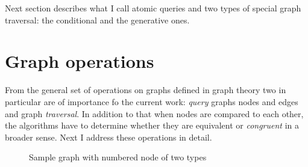 Next section describes what I call atomic queries and two types of special graph traversal: the conditional and the generative ones. 

\section{Graph operations}
From the general set of operations on graphs defined in graph theory \citep{bondy1976graph, west2001graph} two in particular are of importance fo the current work: \textit{query} graphs nodes and edges and graph \textit{traversal}. In addition to that when nodes are compared to each other, the algorithms have to determine whether they are equivalent or \textit{congruent} in a broader sense. Next I address these operations in detail.


\begin{figure}[!ht]
    \centering
    \caption{Sample graph with numbered node of two types}
    \label{fig:example-traversal1}
\end{figure}



